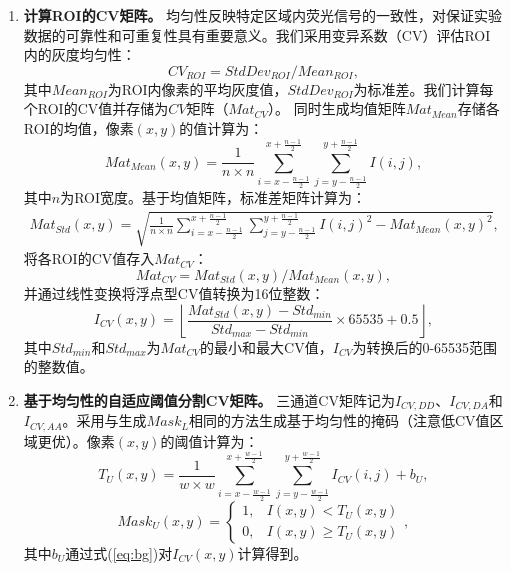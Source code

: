 \begin{enumerate}
\item \textbf{计算ROI的CV矩阵。}  
均匀性反映特定区域内荧光信号的一致性，对保证实验数据的可靠性和可重复性具有重要意义。我们采用变异系数（CV）评估ROI内的灰度均匀性：
\begin{equation}
   {CV}_{ROI}={StdDev}_{ROI} / {Mean}_{ROI},
    \label{eq4}
\end{equation}
其中${Mean}_{ROI}$为ROI内像素的平均灰度值，${StdDev}_{ROI}$为标准差。我们计算每个ROI的CV值并存储为$CV$矩阵（${Mat}_{CV}$）。  
同时生成均值矩阵${Mat}_{Mean}$存储各ROI的均值，像素$(x,y)$的值计算为：
\begin{equation}    
    {Mat}_{Mean}(x,y)=\frac{1}{n \times n} \sum_{i=x- \frac{n-1}{2}}^{x+\frac{n-1}{2}} \sum_{j=y-\frac{n-1}{2}}^{y+\frac{n-1}{2}} I(i,j),
    \label{eq5}
\end{equation}
其中$n$为ROI宽度。基于均值矩阵，标准差矩阵计算为：
\begin{equation}
    \begin{split}
    {Mat}_{Std}(x,y)=
    \sqrt{\frac{1}{n \times n} \sum_{i=x-\frac{n-1}{2}}^{x+\frac{n-1}{2}} \sum_{j=y-\frac{n-1}{2}}^{y+\frac{n-1}{2}}{I(i,j)}^2-{{Mat}_{Mean}(x,y)}^2},
    \end{split}
    \label{eq6}
\end{equation}
将各ROI的CV值存入${Mat}_{CV}$：
\begin{equation}
    {Mat}_{CV}={Mat}_{Std}(x,y)/{Mat}_{Mean}(x,y),
    \label{eq7}
\end{equation}
并通过线性变换将浮点型CV值转换为16位整数：
\begin{equation}
    {I}_{CV}(x,y)=\left\lfloor\frac{{Mat}_{Std}(x,y)-{Std}_{min}} {{Std}_{max}-{Std}_{min}}\times65535 + 0.5\right\rfloor,
\end{equation}
其中${Std}_{min}$和${Std}_{max}$为${Mat}_{CV}$的最小和最大CV值，$I_{CV}$为转换后的0-65535范围的整数值。

\item \textbf{基于均匀性的自适应阈值分割CV矩阵。}  
三通道CV矩阵记为$I_{CV,DD}$、$I_{CV,DA}$和$I_{CV,AA}$。采用与生成${Mask}_{L}$相同的方法生成基于均匀性的掩码（注意低CV值区域更优）。像素$(x,y)$的阈值计算为：
\begin{equation}
    T_U(x,y)=\frac{1}{w \times w} \sum_{i=x-\frac{w-1}{2}}^{x+\frac{w-1}{2}} \sum_{j=y-\frac{w-1}{2}}^{y+\frac{w-1}{2}} {I}_{CV}(i,j)+b_U,
    \label{eq8}
\end{equation}
\begin{equation}
    {Mask}_U(x,y)=\begin{cases}1,&I(x,y) < T_U(x,y)\\ 0,&I(x,y) \ge T_U(x,y)\end{cases},
    \label{eq9}
\end{equation}
其中$b_U$通过式(\ref{eq:bg})对$I_{CV}(x,y)$计算得到。


\end{enumerate}
